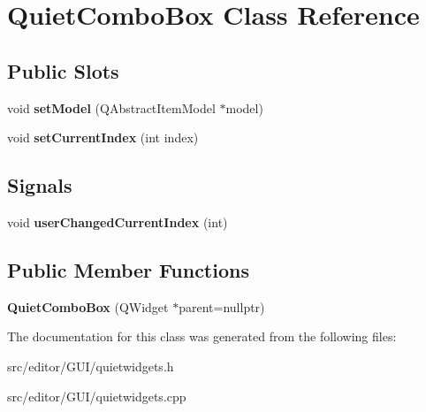 \hypertarget{class_quiet_combo_box}{\section{\-Quiet\-Combo\-Box \-Class \-Reference}
\label{class_quiet_combo_box}
}
\subsection*{\-Public \-Slots}
\begin{DoxyCompactItemize}
\item 
\hypertarget{class_quiet_combo_box_a760934024a1d11cba8a51d993fb47dba}{void {\bfseries set\-Model} (\-Q\-Abstract\-Item\-Model $\ast$model)}\label{class_quiet_combo_box_a760934024a1d11cba8a51d993fb47dba}

\item 
\hypertarget{class_quiet_combo_box_a4134cf3f62ef653ee24d8b52cea56455}{void {\bfseries set\-Current\-Index} (int index)}\label{class_quiet_combo_box_a4134cf3f62ef653ee24d8b52cea56455}

\end{DoxyCompactItemize}
\subsection*{\-Signals}
\begin{DoxyCompactItemize}
\item 
\hypertarget{class_quiet_combo_box_a6312d1e75b1dcb4c5c3b6ad1ac4be524}{void {\bfseries user\-Changed\-Current\-Index} (int)}\label{class_quiet_combo_box_a6312d1e75b1dcb4c5c3b6ad1ac4be524}

\end{DoxyCompactItemize}
\subsection*{\-Public \-Member \-Functions}
\begin{DoxyCompactItemize}
\item 
\hypertarget{class_quiet_combo_box_a030bd6a01f30ba67f4b8cf15b959d966}{{\bfseries \-Quiet\-Combo\-Box} (\-Q\-Widget $\ast$parent=nullptr)}\label{class_quiet_combo_box_a030bd6a01f30ba67f4b8cf15b959d966}

\end{DoxyCompactItemize}


\-The documentation for this class was generated from the following files\-:\begin{DoxyCompactItemize}
\item 
src/editor/\-G\-U\-I/quietwidgets.\-h\item 
src/editor/\-G\-U\-I/quietwidgets.\-cpp\end{DoxyCompactItemize}
